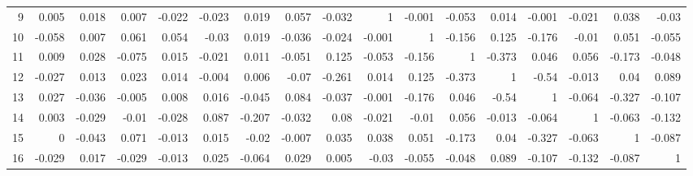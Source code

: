 \documentclass[12pt]{amsart}
\begin{document}
\begin{table}[h]
\begin{center}
{\begin{tabularx}{1.3\textwidth}{r| r r r r r r r r r r r r r r r r}
   9   &     0.005   &     0.018   &     0.007   &    -0.022   &    -0.023   &     0.019    &    0.057    &   -0.032   &         1   &    -0.001   &    -0.053   &     0.014   &    -0.001    &   -0.021   &     0.038   &     -0.03      \\
   10   &   -0.058   &     0.007   &     0.061   &     0.054   &     -0.03   &     0.019    &   -0.036    &   -0.024   &    -0.001   &         1   &    -0.156   &     0.125   &    -0.176    &    -0.01   &     0.051   &    -0.055      \\
   11   &    0.009   &     0.028   &    -0.075   &     0.015   &    -0.021   &     0.011    &   -0.051    &    0.125   &    -0.053   &    -0.156   &         1   &    -0.373   &     0.046    &    0.056   &    -0.173   &    -0.048      \\
   12   &   -0.027   &     0.013   &     0.023   &     0.014   &    -0.004   &     0.006    &    -0.07    &   -0.261   &     0.014   &     0.125   &    -0.373   &         1   &     -0.54    &   -0.013   &      0.04   &     0.089      \\
   13   &    0.027   &    -0.036   &    -0.005   &     0.008   &     0.016   &    -0.045    &    0.084    &   -0.037   &    -0.001   &    -0.176   &     0.046   &     -0.54   &         1    &   -0.064   &    -0.327   &    -0.107      \\
   14   &    0.003   &    -0.029   &     -0.01   &    -0.028   &     0.087   &    -0.207    &   -0.032    &     0.08   &    -0.021   &     -0.01   &     0.056   &    -0.013   &    -0.064    &        1   &    -0.063   &    -0.132      \\
   15   &        0   &    -0.043   &     0.071   &    -0.013   &     0.015   &     -0.02    &   -0.007    &    0.035   &     0.038   &     0.051   &    -0.173   &      0.04   &    -0.327    &   -0.063   &         1   &    -0.087      \\
   16   &   -0.029   &     0.017   &    -0.029   &    -0.013   &     0.025   &    -0.064    &    0.029    &    0.005   &     -0.03   &    -0.055   &    -0.048   &     0.089   &    -0.107    &   -0.132   &    -0.087   &         1      \\
\end{tabularx}}
	\end{center}
\end{table}
\end{document}
